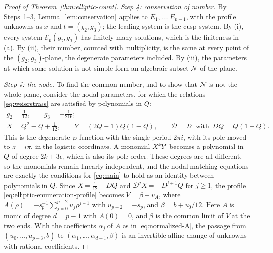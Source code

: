 \begin{proof}[Proof of Theorem~\ref{thm:elliptic-count}]
\emph{Step 4: conservation of number.} By Steps~1--3,
Lemma~\ref{lem:conservation} applies to \(E_1,\ldots,E_{p-1}\), with the
profile unknowns as \(x\) and \(t=(g_2,g_3)\); the leading system is the
cusp system. By (i), every system \(\mathcal E_p(g_2,g_3)\) has finitely
many solutions, which is the finiteness in (a). By (ii), their number,
counted with multiplicity, is the same at every point of the
\((g_2,g_3)\)-plane, the degenerate parameters included. By (iii), the
parameters at which some solution is not simple form an algebraic subset
\(\mathcal N\) of the plane.

\emph{Step 5: the node.} To find the common number, and to show that
\(\mathcal N\) is not the whole plane, consider the nodal parameters,
for which the relations \eqref{eq:weierstrass} are satisfied by
polynomials in \(Q\):
\begin{gather}
 g_2=\frac1{12},\qquad g_3=-\frac1{216};\label{eq:nodal-parameters}\\
 X=Q^2-Q+\frac1{12},\qquad Y=(2Q-1)Q(1-Q),\qquad
 \mathscr D=D\ \text{ with }\ DQ=Q(1-Q).\nonumber
\end{gather}
This is the degenerate \(\wp\)-function with the single period
\(2\pi i\), with its pole moved to \(z=i\pi\), in the logistic
coordinate. A monomial \(X^kY^\epsilon\) becomes a polynomial in \(Q\)
of degree \(2k+3\epsilon\), which is also its pole order. These degrees
are all different, so the monomials remain linearly independent, and
the nodal matching equations are exactly the conditions for
\eqref{eq:main} to hold as an identity between polynomials in \(Q\).
Since \(X=\frac1{12}-DQ\) and \(\mathscr D^jX=-D^{j+1}Q\) for
\(j\ge1\), the profile \eqref{eq:elliptic-enumeration-profile} becomes
\(V=\beta+v_A\), where
\(A(\rho)=-s_p^{-1}\sum_{j=0}^{p-2}u_j\rho^{j+1}\) with
\(u_{p-2}=-s_p\), and \(\beta=b+u_0/12\). Here \(A\) is monic of degree
\(d=p-1\) with \(A(0)=0\), and \(\beta\) is the common limit of \(V\) at
the two ends. With the coefficients \(\alpha_j\) of \(A\) as in
\eqref{eq:normalized-A}, the passage from \((u_0,\ldots,u_{p-3},b)\) to
\((\alpha_1,\ldots,\alpha_{d-1},\beta)\) is an invertible affine change
of unknowns with rational coefficients.


\end{proof}
